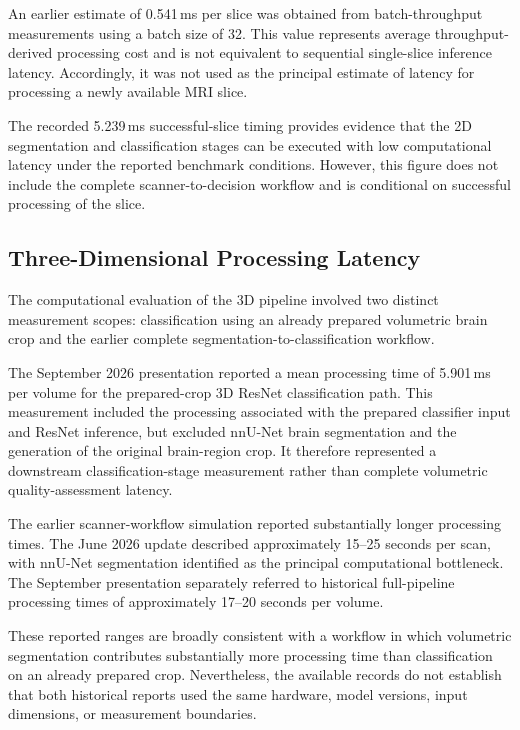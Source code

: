An earlier estimate of 0.541\,ms per slice was obtained from batch-throughput measurements using a batch size of 32. This value represents average throughput-derived processing cost and is not equivalent to sequential single-slice inference latency. Accordingly, it was not used as the principal estimate of latency for processing a newly available MRI slice.

The recorded 5.239\,ms successful-slice timing provides evidence that the 2D segmentation and classification stages can be executed with low computational latency under the reported benchmark conditions. However, this figure does not include the complete scanner-to-decision workflow and is conditional on successful processing of the slice.

\subsection{Three-Dimensional Processing Latency}
\label{subsec:results_3d_latency}

The computational evaluation of the 3D pipeline involved two distinct measurement scopes: classification using an already prepared volumetric brain crop and the earlier complete segmentation-to-classification workflow.

The September 2026 presentation reported a mean processing time of 5.901\,ms per volume for the prepared-crop 3D ResNet classification path. This measurement included the processing associated with the prepared classifier input and ResNet inference, but excluded nnU-Net brain segmentation and the generation of the original brain-region crop. It therefore represented a downstream classification-stage measurement rather than complete volumetric quality-assessment latency.

The earlier scanner-workflow simulation reported substantially longer processing times. The June 2026 update described approximately 15--25 seconds per scan, with nnU-Net segmentation identified as the principal computational bottleneck. The September presentation separately referred to historical full-pipeline processing times of approximately 17--20 seconds per volume.

These reported ranges are broadly consistent with a workflow in which volumetric segmentation contributes substantially more processing time than classification on an already prepared crop. Nevertheless, the available records do not establish that both historical reports used the same hardware, model versions, input dimensions, or measurement boundaries.

